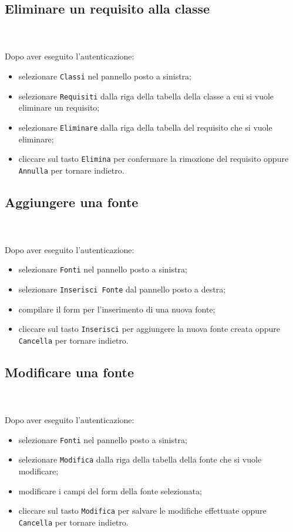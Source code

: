	\subsection{Eliminare un requisito alla classe} \mbox{}\\ \mbox{}\\
	Dopo aver eseguito l'autenticazione:
	\begin{itemize}
		\item selezionare \texttt{Classi} nel pannello posto a sinistra;
		\item selezionare \texttt{Requisiti} dalla riga della tabella della 
		classe
		a cui si vuole eliminare un requisito;\
		\item selezionare \texttt{Eliminare} dalla riga della tabella del 
		requisito
		che si vuole eliminare;
		\item cliccare sul tasto \texttt{Elimina} per confermare la rimozione 
		del requisito
		oppure \texttt{Annulla} per tornare indietro.
	\end{itemize}
	
	\subsection{Aggiungere una fonte} \mbox{}\\ \mbox{}\\
	Dopo aver eseguito l'autenticazione:
	\begin{itemize}
		\item selezionare \texttt{Fonti} nel pannello posto a sinistra;
		\item selezionare \texttt{Inserisci Fonte} dal pannello posto a destra;
		\item compilare il form per l'inserimento di una nuova fonte;
		\item cliccare sul tasto \texttt{Inserisci} per aggiungere la nuova 
		fonte 
		creata oppure \texttt{Cancella} per tornare indietro.	
	\end{itemize}
	
	\subsection{Modificare una fonte} \mbox{}\\ \mbox{}\\
	Dopo aver eseguito l'autenticazione:
	\begin{itemize}
		\item selezionare \texttt{Fonti} nel pannello posto a sinistra;
		\item selezionare \texttt{Modifica} dalla riga della tabella della fonte
		che si vuole modificare;
		\item modificare i campi del form della fonte selezionata;
		\item cliccare sul tasto \texttt{Modifica} per salvare le modifiche 
		effettuate
		oppure \texttt{Cancella} per tornare indietro.
	\end{itemize}
	
